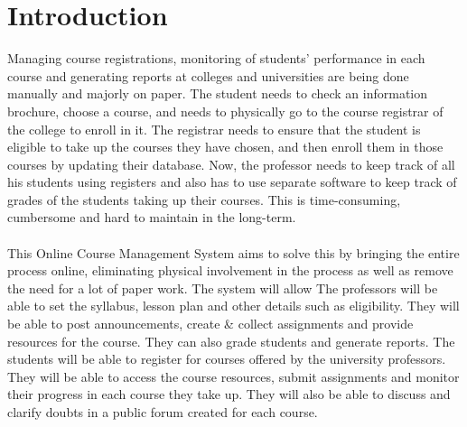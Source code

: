\documentclass[12pt, a4]{report}
\begin{document}
\maketitle
\tableofcontents


\newpage
\chapter{Introduction}
Managing course registrations, monitoring of students' performance in each course and generating reports at colleges and universities are being done manually and majorly on paper. The student needs to check an information brochure, choose a course, and needs to physically go to the course registrar of the college to enroll in it. The registrar needs to ensure that the student is eligible to take up the courses they have chosen, and then enroll them in those courses by updating their database. Now, the professor needs to keep track of all his students using registers and also has to use separate software to keep track of grades of the students taking up their courses. This is time-consuming, cumbersome and hard to maintain in the long-term.
\\\\
This Online Course Management System aims to solve this by bringing the entire process online, eliminating physical involvement in the process as well as remove the need for a lot of paper work.
The system will allow The professors will be able to set the syllabus, lesson plan and other details such as eligibility. They will be able to post announcements, create \& collect assignments and provide resources for the course. They can also grade students and generate reports.
The students will be able to register for courses offered by the university professors. They will be able to access the course resources, submit assignments and monitor their progress in each course they take up. They will also be able to discuss and clarify doubts in a public forum created for each course.

\end{document}
